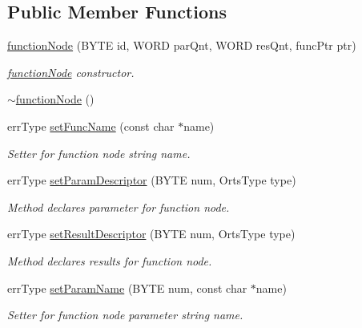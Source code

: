 \subsection*{Public Member Functions}
\begin{DoxyCompactItemize}
\item 
\hyperlink{classfunctionNode_a158c087916c9475fec666a0cda8534c3}{functionNode} (BYTE id, WORD parQnt, WORD resQnt, funcPtr ptr)
\begin{DoxyCompactList}\small\item\em \hyperlink{classfunctionNode}{functionNode} constructor. \item\end{DoxyCompactList}\item 
\hyperlink{classfunctionNode_a66aaf88fde5f18197399b7249c9698bb}{$\sim$functionNode} ()
\item 
errType \hyperlink{classfunctionNode_ab10bc5bc10118110b85c62b6bcde5540}{setFuncName} (const char $\ast$name)
\begin{DoxyCompactList}\small\item\em Setter for function node string name. \item\end{DoxyCompactList}\item 
errType \hyperlink{classfunctionNode_a788aab452c31de6af90c0b9436fcb216}{setParamDescriptor} (BYTE num, OrtsType type)
\begin{DoxyCompactList}\small\item\em Method declares parameter for function node. \item\end{DoxyCompactList}\item 
errType \hyperlink{classfunctionNode_a2ad0aac1b76d2c086fcf894c8ee15742}{setResultDescriptor} (BYTE num, OrtsType type)
\begin{DoxyCompactList}\small\item\em Method declares results for function node. \item\end{DoxyCompactList}\item 
errType \hyperlink{classfunctionNode_a55c904492f4812572d0598a2facb2875}{setParamName} (BYTE num, const char $\ast$name)
\begin{DoxyCompactList}\small\item\em Setter for function node parameter string name. \item\end{DoxyCompactList}\item 

\end{DoxyCompactItemize}
